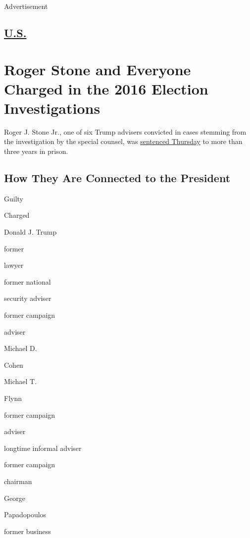 Advertisement

\hypertarget{-us-}{%
\subsection{\texorpdfstring{
\href{https://www.nytimes3xbfgragh.onion/section/us}{U.S.}
}{ U.S. }}\label{-us-}}

\hypertarget{roger-stone-and-everyone-charged-in-the-2016-election-investigations}{%
\section{Roger Stone and Everyone Charged in the 2016 Election
Investigations}\label{roger-stone-and-everyone-charged-in-the-2016-election-investigations}}

Roger J. Stone Jr., one of six Trump advisers convicted in cases
stemming from the investigation by the special counsel, was
\href{https://www.nytimes3xbfgragh.onion/2020/02/20/us/roger-stone-sentencing.html}{sentenced
Thursday} to more than three years in prison.

\hypertarget{how-they-are-connected-to-the-president}{%
\subsection{How They Are Connected to the
President}\label{how-they-are-connected-to-the-president}}

Guilty

Charged

Donald J. Trump

former

lawyer

former national

security adviser

former campaign

adviser

Michael D.

Cohen

Michael T.

Flynn

former campaign

adviser

longtime informal adviser

former campaign

chairman

George

Papadopoulos

former business

